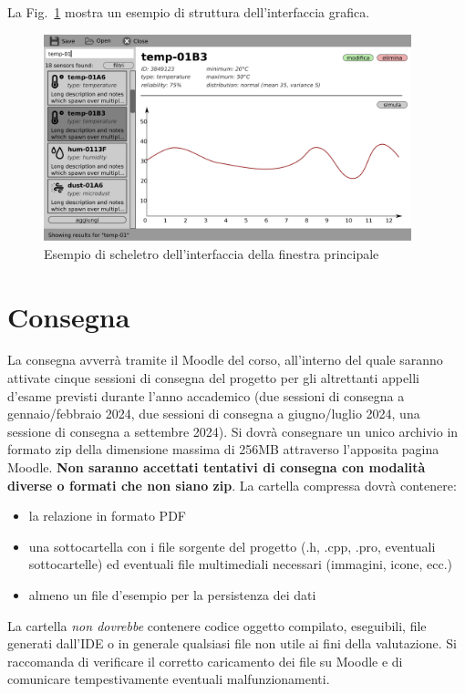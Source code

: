 \documentclass[10pt,a4paper,oneside]{article}
\begin{document}
\begin{enumerate}
La Fig.~\ref{fig:skeleton} mostra un esempio di struttura dell'interfaccia grafica.

\begin{figure}[t]
 \includegraphics[width=0.95\textwidth]{assets/gui-skeleton-sample}
 \caption{Esempio di scheletro dell'interfaccia della finestra principale}\label{fig:skeleton}
\end{figure}
\end{enumerate}

\section{Consegna}
La consegna avverrà tramite il Moodle del corso, all'interno del quale saranno attivate cinque sessioni di consegna del progetto per gli altrettanti appelli d'esame previsti durante l'anno accademico (due sessioni di consegna a gennaio/febbraio 2024, due sessioni di consegna a giugno/luglio 2024, 
una sessione di consegna a settembre 2024). Si dovrà consegnare un unico archivio in formato zip della dimensione massima di 256MB attraverso l'apposita pagina Moodle. \textbf{Non saranno accettati tentativi di consegna con modalità diverse o formati che non siano zip}. La cartella compressa dovrà contenere:
\begin{itemize}
 \item la relazione in formato PDF
 \item una sottocartella con i file sorgente del progetto (.h, .cpp, .pro, eventuali sottocartelle) ed eventuali file multimediali necessari (immagini, icone, ecc.)
 \item almeno un file d'esempio per la persistenza dei dati
\end{itemize}
La cartella \emph{non dovrebbe} contenere codice oggetto compilato, eseguibili, file generati dall'IDE o in generale qualsiasi file non utile ai fini della valutazione. Si raccomanda di verificare il corretto caricamento dei file su Moodle e di comunicare tempestivamente eventuali malfunzionamenti.
\end{document}
